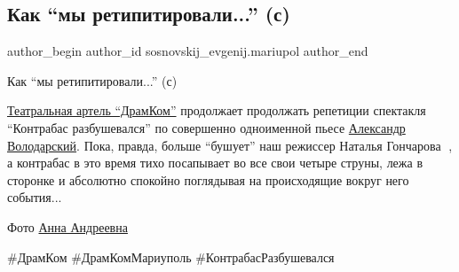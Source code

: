  
 
 
 
 

\subsection{Как \enquote{мы ретипитировали...} (с)}
\label{sec:26_12_2019.fb.sosnovskij_evgenij.mariupol.1.kontrabas_razbushevalsja}

\ifcmt
 author_begin
   author_id sosnovskij_evgenij.mariupol
 author_end
\fi

Как \enquote{мы ретипитировали...} (с)

\href{https://www.facebook.com/groups/dramkom}{Театральная артель \enquote{ДрамКом}} продолжает продолжать репетиции спектакля
\enquote{Контрабас разбушевался} по совершенно одноименной пьесе \href{https://www.facebook.com/avolodarskiy1}{Александр Володарский}.
Пока, правда, больше \enquote{бушует} наш режиссер Наталья Гончарова 🙂, а контрабас в
это время тихо посапывает во все свои четыре струны, лежа в сторонке и
абсолютно спокойно поглядывая на происходящие вокруг него события... 

Фото \href{https://www.facebook.com/AnnaAndreyewna}{Анна Андреевна}

\#ДрамКом \#ДрамКомМариуполь \#КонтрабасРазбушевался
